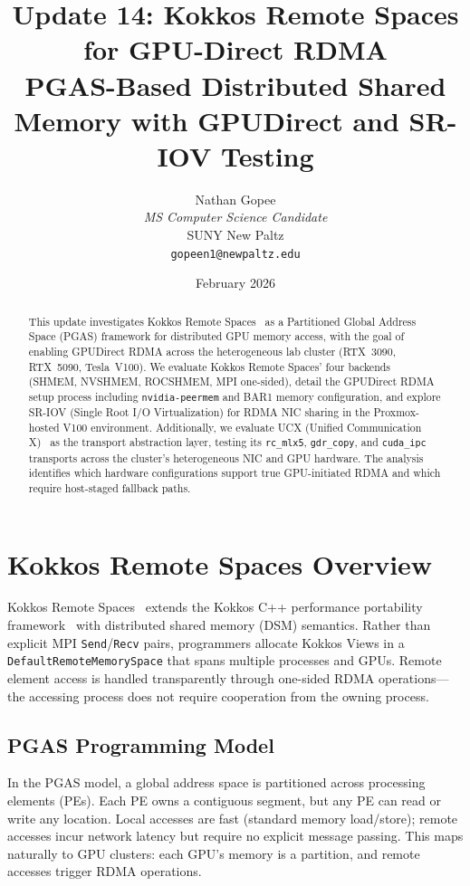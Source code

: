 \documentclass[11pt,letterpaper]{article}
\title{
    \vspace{-1cm}
    \textbf{Update 14: Kokkos Remote Spaces for GPU-Direct RDMA} \\[0.5em]
    \large PGAS-Based Distributed Shared Memory with GPUDirect and SR-IOV Testing
}
\author{
    Nathan Gopee \\
    \textit{MS Computer Science Candidate} \\
    SUNY New Paltz \\
    \texttt{gopeen1@newpaltz.edu}
}
\date{February 2026}
\begin{document}
\maketitle

\begin{abstract}
\noindent
This update investigates Kokkos Remote Spaces~\cite{kokkos-rs} as a Partitioned Global Address Space (PGAS) framework for distributed GPU memory access, with the goal of enabling GPUDirect RDMA across the heterogeneous lab cluster (RTX~3090, RTX~5090, Tesla~V100). We evaluate Kokkos Remote Spaces' four backends (SHMEM, NVSHMEM, ROCSHMEM, MPI one-sided), detail the GPUDirect RDMA setup process including \texttt{nvidia-peermem} and BAR1 memory configuration, and explore SR-IOV (Single Root I/O Virtualization) for RDMA NIC sharing in the Proxmox-hosted V100 environment. Additionally, we evaluate UCX (Unified Communication X)~\cite{ucx} as the transport abstraction layer, testing its \texttt{rc\_mlx5}, \texttt{gdr\_copy}, and \texttt{cuda\_ipc} transports across the cluster's heterogeneous NIC and GPU hardware. The analysis identifies which hardware configurations support true GPU-initiated RDMA and which require host-staged fallback paths.
\end{abstract}

\section{Kokkos Remote Spaces Overview}

Kokkos Remote Spaces~\cite{kokkos-rs} extends the Kokkos C++ performance portability framework~\cite{kokkos} with distributed shared memory (DSM) semantics. Rather than explicit MPI \texttt{Send}/\texttt{Recv} pairs, programmers allocate Kokkos Views in a \texttt{DefaultRemoteMemorySpace} that spans multiple processes and GPUs. Remote element access is handled transparently through one-sided RDMA operations---the accessing process does not require cooperation from the owning process.

\subsection{PGAS Programming Model}

In the PGAS model, a global address space is partitioned across processing elements (PEs). Each PE owns a contiguous segment, but any PE can read or write any location. Local accesses are fast (standard memory load/store); remote accesses incur network latency but require no explicit message passing. This maps naturally to GPU clusters: each GPU's memory is a partition, and remote accesses trigger RDMA operations.
\end{document}
